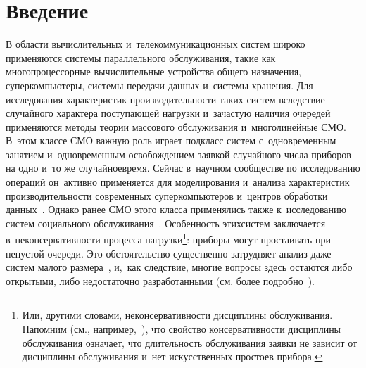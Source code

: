 
  
\vspace*{3pt}



\thispagestyle{headings}

\begin{multicols}{2}

\label{st\stat}


\section{Введение}

\vspace*{-3pt}


В области вычислительных и~телекоммуникационных систем широко применяются 
системы параллельного обслуживания, такие как многопроцессорные вычислительные 
устройства общего назначения, суперкомпьютеры, сис\-те\-мы передачи данных и~сис\-те\-мы 
хранения. Для исследования характеристик производительности таких сис\-тем 
вследствие случайного характера по\-сту\-па\-ющей нагрузки и~зачастую наличия 
очередей применяются методы теории массового обслуживания и~многолинейные 
СМО. В~этом классе СМО важную роль играет подкласс 
систем с~одновременным занятием и~одновременным освобождением заявкой случайного 
числа приборов на одно и~то же случайное\linebreak время. Сейчас в~научном сообществе по 
исследованию операций он~активно применяется для моделирования и~анализа 
характеристик производительности современных суперкомпьютеров и~\mbox{центров} 
обработки данных~\cite{ee0, ee1, o1, o2, o3}. Однако ранее СМО этого класса 
применялись также к~исследованию сис\-тем социального обслуживания~\cite{lg1,ssk}. 
Особенность этих\linebreak сис\-тем заключается в~неконсервативности про\-цесса 
нагрузки\footnote[4]{Или, другими словами, неконсервативности
дисциплины обслуживания. Напомним (см., например,~\cite[с.~49]{yash}), что 
свойство консервативности дисциплины обслуживания означает, что дли\-тель\-ность 
обслуживания заявки не зависит от дисциплины обслуживания и~нет искусственных 
простоев прибора.}: приборы могут простаивать при не\-пус\-той очереди.
Это обстоятельство существенно затрудняет анализ даже сис\-тем малого размера~\cite{ee4, chak}, 
и,~как следствие, многие вопросы здесь остаются либо открытыми, 
либо недостаточно разработанными (см. более подробно~\cite{ee311}).


\end{multicols}
